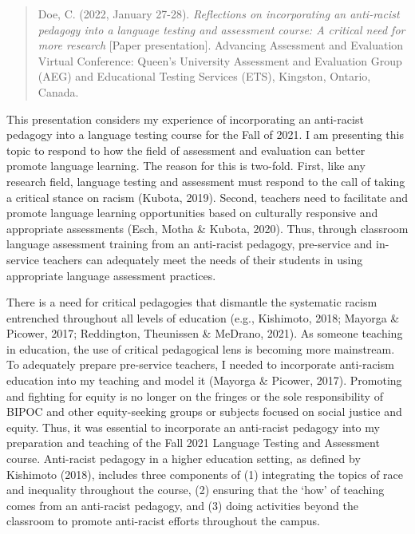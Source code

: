 \documentclass[
]{book}
\begin{document}
\begin{quote}
Doe, C. (2022, January 27-28). \emph{Reflections on incorporating an anti-racist pedagogy into a language testing and assessment course: A critical need for more research} {[}Paper presentation{]}. Advancing Assessment and Evaluation Virtual Conference: Queen's University Assessment and Evaluation Group (AEG) and Educational Testing Services (ETS), Kingston, Ontario, Canada.
\end{quote}

This presentation considers my experience of incorporating an anti-racist pedagogy into a language testing course for the Fall of 2021. I am presenting this topic to respond to how the field of assessment and evaluation can better promote language learning. The reason for this is two-fold. First, like any research field, language testing and assessment must respond to the call of taking a critical stance on racism (Kubota, 2019). Second, teachers need to facilitate and promote language learning opportunities based on culturally responsive and appropriate assessments (Esch, Motha \& Kubota, 2020). Thus, through classroom language assessment training from an anti-racist pedagogy, pre-service and in-service teachers can adequately meet the needs of their students in using appropriate language assessment practices.

There is a need for critical pedagogies that dismantle the systematic racism entrenched throughout all levels of education (e.g., Kishimoto, 2018; Mayorga \& Picower, 2017; Reddington, Theunissen \& MeDrano, 2021). As someone teaching in education, the use of critical pedagogical lens is becoming more mainstream. To adequately prepare pre-service teachers, I needed to incorporate anti-racism education into my teaching and model it (Mayorga \& Picower, 2017). Promoting and fighting for equity is no longer on the fringes or the sole responsibility of BIPOC and other equity-seeking groups or subjects focused on social justice and equity. Thus, it was essential to incorporate an anti-racist pedagogy into my preparation and teaching of the Fall 2021 Language Testing and Assessment course. Anti-racist pedagogy in a higher education setting, as defined by Kishimoto (2018), includes three components of (1) integrating the topics of race and inequality throughout the course, (2) ensuring that the `how' of teaching comes from an anti-racist pedagogy, and (3) doing activities beyond the classroom to promote anti-racist efforts throughout the campus.
\end{document}

